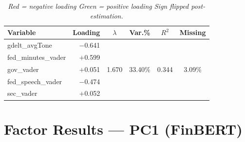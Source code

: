 \documentclass[10pt]{article}
\begin{document}
\begin{table}[h!]
\centering
\begin{tabular}{lrcccc}
\toprule
\textbf{Variable}
  & \textbf{Loading}
  & \textbf{$\lambda$}
  & \textbf{Var.\%}
  & \textbf{$R^{2}$}
  & \textbf{Missing} \\
\midrule

gdelt\_avgTone
  & \textcolor{redneg}{$-$0.641}
  & \multirow{5}{*}{1.670}
  & \multirow{5}{*}{33.40\%}
  & \multirow{5}{*}{0.344}
  & \multirow{5}{*}{3.09\%} \\

\rowcolor{rowgray}
fed\_minutes\_vader  & \textcolor{greenpos}{$+$0.599} &&&& \\

gov\_vader           & $+$0.051 &&&& \\

\rowcolor{rowgray}
fed\_speech\_vader   & \textcolor{redneg}{$-$0.474} &&&& \\

sec\_vader           & $+$0.052 &&&& \\

\bottomrule
\end{tabular}
\caption*{\footnotesize\itshape
  \textcolor{redneg}{Red} = negative loading\quad
  \textcolor{greenpos}{Green} = positive loading\quad
  Sign flipped post-estimation.}
\end{table}



\section*{Factor Results --- PC1 (FinBERT)}
\end{document}
